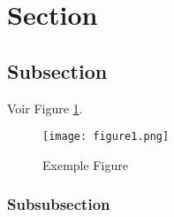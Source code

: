 \section{Section}
\lipsum[6]\cite{dupont2023}
\subsection{Subsection}
\lipsum[8] Voir Figure \ref{Fig1}.

\begin{figure}[h]
\centering
\texttt{[image: figure1.png]}
\caption{Exemple Figure}
\label{Fig1}
\end{figure}

\subsubsection{Subsubsection}
\lipsum[9]